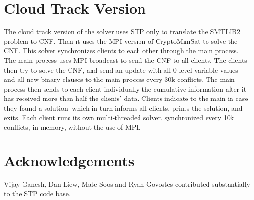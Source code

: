 \documentclass{easychair}
\begin{document}
\section{Cloud Track Version}
The cloud track version of the solver uses STP only to translate the SMTLIB2 problem to CNF. Then it uses the MPI version of CryptoMiniSat to solve the CNF. This solver synchronizes clients to each other through the main process. The main process uses MPI broadcast to send the CNF to all clients. The clients then try to solve the CNF, and send an update with all 0-level variable values and all new binary clauses to the main process every 30k conflicts. The main process then sends to each client individually the cumulative information after it has received more than half the clients' data. Clients indicate to the main in case they found a solution, which in turn informs all clients, prints the solution, and exits. Each client runs its own multi-threaded solver, synchronized every 10k conflicts, in-memory, without the use of MPI.

\section*{Acknowledgements}
Vijay Ganesh, Dan Liew, Mate Soos and Ryan Govostes contributed substantially to the STP code base.




\vfill
\pagebreak
\end{document}
